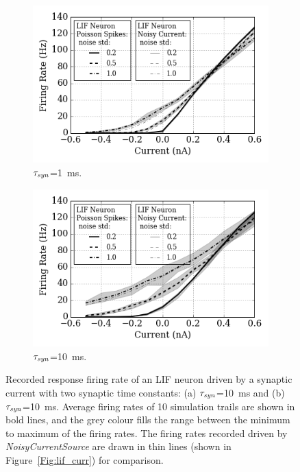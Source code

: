 	\begin{figure}[tbp!]
		\centering
		\begin{subfigure}[t]{0.49\textwidth}
			\includegraphics[width=\textwidth]{pics_iconip/spiked_curve_1.png}
			\caption{$\tau_{\textit{\textrm{syn}}}$=1~ms.}
		\end{subfigure}
		\begin{subfigure}[t]{0.49\textwidth}
			\includegraphics[width=\textwidth]{pics_iconip/spiked_curve_10.png}
			\caption{$\tau_{\textit{\textrm{syn}}}$=10~ms.}
		\end{subfigure}
		\caption[Recorded response firing rate driven by a synaptic current.]{Recorded response firing rate of an LIF neuron driven by a synaptic current with two synaptic time constants: (a) $\tau_{\textit{\textrm{syn}}}$=10~ms and (b) $\tau_{\textit{\textrm{syn}}}$=10~ms. Average firing rates of 10 simulation trails are shown in bold lines, and the grey colour fills the range between the minimum to maximum of the firing rates. The firing rates recorded driven by \textit{NoisyCurrentSource} are drawn in thin lines (shown in Figure~\ref{Fig:lif_curr}) for comparison.}
		\label{Fig:spike_curr}
	\end{figure}
	
